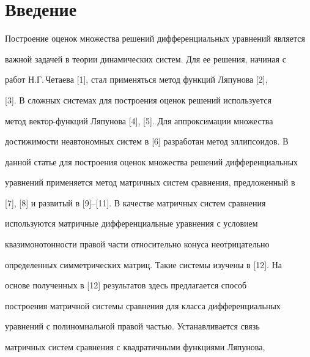  




\maketitle 


\label{begin} 


 


 


\section{Введение} 


 


Построение оценок множества решений дифференциальных уравнений является 


важной задачей в теории динамических систем. Для ее решения, начиная с 


работ Н.Г.\,Четаева [1], стал применяться метод функций Ляпунова [2], 


[3]. В сложных системах для построения оценок решений используется 


метод вектор-функций Ляпунова [4], [5]. Для аппроксимации множества 


достижимости неавтономных систем в [6] разработан метод эллипсоидов. В 


данной статье для построения оценок множества решений дифференциальных 


уравнений применяется метод матричных систем сравнения, предложенный в 


[7], [8] и развитый в [9]--[11]. В качестве матричных систем сравнения 


используются матричные дифференциальные уравнения с условием 


квазимонотонности правой части относительно конуса неотрицательно 


определенных симметрических матриц. Такие системы изучены в [12]. На 


основе полученных в [12] результатов здесь предлагается способ 


построения матричной системы сравнения для класса дифференциальных 


уравнений с полиномиальной правой частью. Устанавливается связь 


матричных систем сравнения с квадратичными функциями Ляпунова, 


